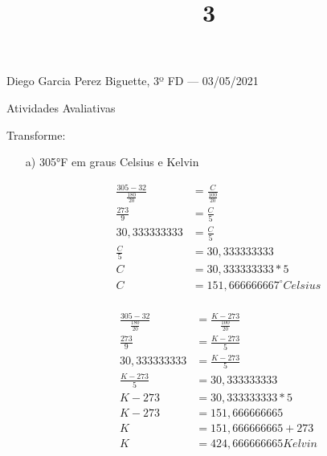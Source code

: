 \documentclass{SchoolBook}
\begin{document}
    \begin{day}{Diego Garcia Perez Biguette, 3º FD --- 03/05/2021}
        \title{3}{Atividades Avaliativas}
        
        Transforme:
        \begin{enumerate}
            \item[a)] 305°F em graus Celsius e Kelvin
            
            \begin{multicols}{2}
                \begin{align*}
                    \frac{305-32}{\frac{180}{20}} &= \frac{C}{\frac{100}{20}} \\
                                    \frac{273}{9} &= \frac{C}{5} \\
                                     30,333333333 &= \frac{C}{5} \\
                                      \frac{C}{5} &= 30,333333333 \\
                                                C &= 30,333333333 * 5 \\
                                                C &= 151,666666667^\circ Celsius
                \end{align*} \\
                \begin{align*}
                    \frac{305-32}{\frac{180}{20}} &= \frac{K-273}{\frac{100}{20}} \\
                                    \frac{273}{9} &= \frac{K-273}{5} \\
                                     30,333333333 &= \frac{K-273}{5} \\
                                  \frac{K-273}{5} &= 30,333333333 \\
                                            K-273 &= 30,333333333 * 5 \\
                                            K-273 &= 151,666666665 \\
                                                K &= 151,666666665 + 273 \\
                                                K &= 424,666666665 Kelvin
                \end{align*}
            \end{multicols}
            

\end{enumerate}
\end{day}
\end{document}
